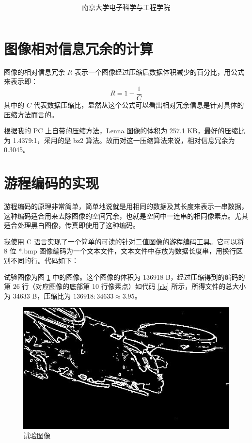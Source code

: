 \documentclass[a4paper,10pt]{article}
\theoremstyle{definition}
\theoremstyle{plain}
\begin{document}
\title{\Title \titlename\\  \vicetitle}
\author{ 南京大学电子科学与工程学院\\   \myauthor} 
\maketitle

\section{图像相对信息冗余的计算}
图像的相对信息冗余 $R$ 表示一个图像经过压缩后数据体积减少的百分比，用公式来表示即：
\begin{equation*}
R=1-\frac{1}{C}
\end{equation*}
其中的 $C$ 代表数据压缩比，显然从这个公式可以看出相对冗余信息是针对具体的压缩方法而言的。

根据我的 PC 上自带的压缩方法，Lenna 图像的体积为 257.1 KB，最好的压缩比为 1.4379:1，采用的是 bz2 算法。故而对这一压缩算法来说，相对信息冗余为 0.3045。
\section{游程编码的实现}
游程编码的原理非常简单，简单地说就是用相同的数据及其长度来表示一串数据，这种编码适合用来去除图像的空间冗余，也就是空间中一连串的相同像素点。尤其适合处理黑白图像，传真即使用了这种编码。

我使用 C 语言实现了一个简单的可读的针对二值图像的游程编码工具。它可以将 8 位 *.bmp 图像编码为一个文本文件，文本文件中存放为数据长度串，用换行区别不同的行。代码如下：


试验图像为图 \ref{exp} 中的图像。这个图像的体积为 136918 B，经过压缩得到的编码的第 26 行（对应图像的底部第 10 行像素点）如代码 \ref{rle} 所示，所得文件的总大小为 34633 B，压缩比为 $136918:34633\approx3.95$。

\begin{figure}[htbp]
\centering
\includegraphics[scale=.8]{f2.jpg}
\caption{试验图像\label{exp}}
\end{figure}
\end{document}
